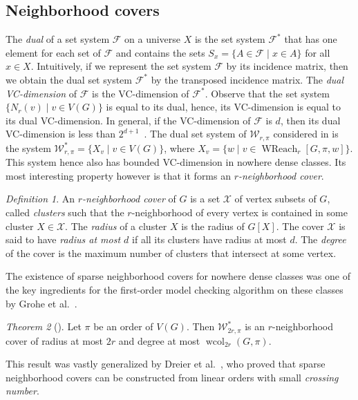 \documentclass[1p,number,a4paper]{elsarticle}
\theoremstyle{remark}
\newcommand{\Ff}{\mathcal{F}}
\newcommand{\Xx}{\mathcal{X}}
\newcommand{\Ww}{\mathcal{W}}
\DeclareMathOperator{\wcol}{wcol}
\DeclareMathOperator{\WReach}{WReach}
\newtheorem{theorem}{Theorem}[section]
\newtheorem{definition}[theorem]{Definition}
\begin{document}
\subsection{Neighborhood covers}

The \emph{dual} of a set system $\Ff$ on a universe $X$ is the set system $\Ff^*$ that has one element for each set of $\Ff$ and contains the sets $S_x=\{A \in \Ff \mid x\in A\}$ for all $x\in X$. Intuitively, if we represent the set system $\Ff$ by its incidence matrix, then we obtain the dual set system $\Ff^*$ by the transposed incidence matrix. 
The \emph{dual VC-dimension} of $\Ff$ is the VC-dimension of $\Ff^*$. 
Observe that the set system $\{N_r(v) \mid v\in V(G)\}$ is equal to its dual, hence, its VC-dimension is equal to its dual VC-dimension. In general, if the VC-dimension of $\Ff$ is $d$, then its dual VC-dimension is less than $2^{d+1}$~\cite{assouad1983densite}. The dual set system of $\Ww_{r,\pi}$ considered in  is the system $\Ww^*_{r,\pi}=\{X_v\mid v\in V(G)\}$, where $X_v=\{w\mid v\in \WReach_r[G,\pi,w]\}$. This system hence also has bounded VC-dimension in nowhere dense classes. 
Its most interesting property however is that it forms an \emph{$r$-neighborhood cover}. 

\begin{definition}
    An \emph{$r$-neighborhood cover} of $G$ is a set $\Xx$ of vertex subsets of $G$, called \emph{clusters} such that the $r$-neighborhood of every vertex is contained in some cluster $X\in \Xx$. The \emph{radius} of a cluster $X$ is the radius of $G[X]$. The cover $\Xx$ is said to have \emph{radius at most $d$} if all its clusters have radius at most $d$. The \emph{degree} of the cover is the maximum number of clusters that intersect at some vertex. 
\end{definition}

The existence of sparse neighborhood covers for nowhere dense classes was one of the key ingredients for the first-order model checking algorithm on these classes by Grohe et al.~\cite{grohe2017deciding}. 

\begin{theorem}[\cite{grohe2017deciding}]
    Let $\pi$ be an order of $V(G)$. Then $\Ww_{2r,\pi}^*$ is an $r$-neighborhood cover of radius at most $2r$ and degree at most $\wcol_{2r}(G,\pi)$. 
\end{theorem}

This result was vastly generalized by Dreier et al.~\cite{dreier2023first}, who proved that sparse 
neighborhood covers can be constructed from linear orders with small \emph{crossing number}. 
\end{document}
